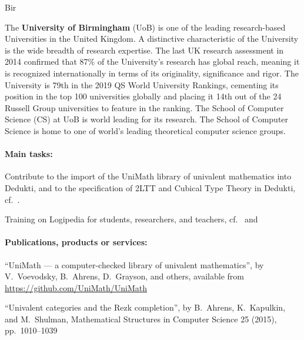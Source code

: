 \begin{sitedescription}{Bir}

The \textbf{University of Birmingham} (UoB) is one of the leading research-based Universities in the United Kingdom. A distinctive
characteristic of the University is the wide breadth of research expertise. The last UK research assessment in 2014 confirmed that
87\% of the University’s research has global reach, meaning it is recognized internationally in terms of its originality, significance and rigor. The University is 79th in the 2019 QS World University Rankings, cementing its position in the top 100 universities globally and placing it 14th out of the 24 Russell Group universities to feature in the ranking. The School of Computer Science (CS) at UoB is world leading for its research. 
The School of Computer Science is home to one of world's leading theoretical computer science groups.

\paragraph{Main tasks:}

\begin{compactitem}
\item Contribute to the import of the UniMath library of univalent mathematics into Dedukti, and to the specification of 2LTT and Cubical Type Theory in Dedukti, cf.\ .
\item Training on Logipedia for students, researchers, and teachers, cf.\  and 

\end{compactitem}

\paragraph{Publications, products or services:}

\begin{compactitem}
 \item ``UniMath --- a computer-checked library of univalent mathematics'', by V.~Voevodsky, B.~Ahrens, D.~Grayson, and others, available from \url{https://github.com/UniMath/UniMath}
 \item ``Univalent categories and the Rezk completion'', by B.~Ahrens, K.~Kapulkin, and M.~Shulman, Mathematical Structures in Computer Science 25 (2015), pp.~1010--1039
\end{compactitem}


\end{sitedescription}
